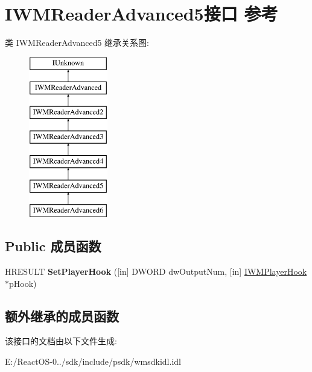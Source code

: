 \hypertarget{interface_i_w_m_reader_advanced5}{}\section{I\+W\+M\+Reader\+Advanced5接口 参考}
\label{interface_i_w_m_reader_advanced5}
类 I\+W\+M\+Reader\+Advanced5 继承关系图\+:\begin{figure}[H]
\begin{center}
\leavevmode
\includegraphics[height=7.000000cm]{interface_i_w_m_reader_advanced5}
\end{center}
\end{figure}
\subsection*{Public 成员函数}
\begin{DoxyCompactItemize}
\item 
\mbox{\label{interface_i_w_m_reader_advanced5_a8955b4fa836078fcb2a1570283bd0aa8}} 
H\+R\+E\+S\+U\+LT {\bfseries Set\+Player\+Hook} (\mbox{[}in\mbox{]} D\+W\+O\+RD dw\+Output\+Num, \mbox{[}in\mbox{]} \hyperlink{interface_i_w_m_player_hook}{I\+W\+M\+Player\+Hook} $\ast$p\+Hook)
\end{DoxyCompactItemize}
\subsection*{额外继承的成员函数}


该接口的文档由以下文件生成\+:\begin{DoxyCompactItemize}
\item 
E\+:/\+React\+O\+S-\/0../sdk/include/psdk/wmsdkidl.\+idl\end{DoxyCompactItemize}
